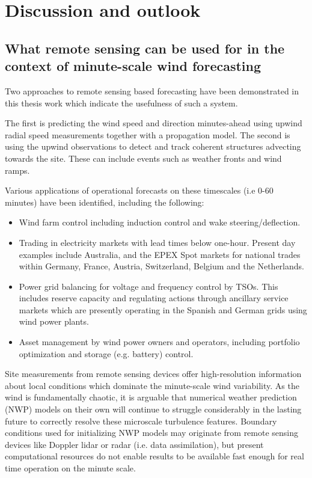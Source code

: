 \chapter{Discussion and outlook}
\label{sec:discussion}

\clearpage
\section{What remote sensing can be used for in the context of minute-scale wind forecasting}
\label{sec:discussion_rs}
\bigskip

Two approaches to remote sensing based forecasting have been demonstrated in this thesis work which indicate the usefulness of such a system.

The first is predicting the wind speed and direction minutes-ahead using upwind radial speed measurements together with a propagation model. The second is using the upwind observations to detect and track coherent structures advecting towards the site. These can include events such as weather fronts and wind ramps.

Various applications of operational forecasts on these timescales (i.e 0-60 minutes) have been identified, including the following:

\begin{itemize}
    \item Wind farm control including induction control and wake steering/deflection.
    \item Trading in electricity markets with lead times below one-hour. Present day examples include Australia, and the EPEX Spot markets for national trades within Germany, France, Austria, Switzerland, Belgium and the Netherlands.
    \item Power grid balancing for voltage and frequency control by TSOs. This includes reserve capacity and regulating actions through ancillary service markets which are presently operating in the Spanish and German grids using wind power plants.
    \item Asset management by wind power owners and operators, including portfolio optimization and storage (e.g. battery) control.
\end{itemize}

Site measurements from remote sensing devices offer high-resolution information about local conditions which dominate the minute-scale wind variability. As the wind is fundamentally chaotic, it is arguable that numerical weather prediction (NWP) models on their own will continue to struggle considerably in the lasting future to correctly resolve these microscale turbulence features. Boundary conditions used for initializing NWP models may originate from remote sensing devices like Doppler lidar or radar (i.e. data assimilation), but present computational resources do not enable results to be available fast enough for real time operation on the minute scale.

